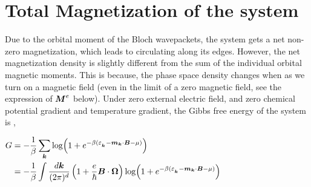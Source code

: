 \documentclass{report}
\renewcommand\vec[1]{\ensuremath\boldsymbol{#1}} %
\begin{document}
\section{Total Magnetization of the system}
Due to the orbital moment of the Bloch wavepackets, the system gets a net non-zero magnetization, which leads to circulating along its edges.
However, the net magnetization density is slightly different from the sum of the individual orbital magnetic moments. This is because, the phase space density changes when as we turn on a magnetic field (even in the limit of a zero magnetic field, see the expression of $\vec{M}^e$ below).
Under zero external electric field, and zero chemical potential gradient and temperature gradient, the Gibbs free energy of the system is \cite{PhysRevLett.97.026603}, 

$\begin{aligned}
G &= -\frac{1}{\beta} \sum_{\vec{k}} \log(1 + e^{-\beta(\varepsilon_{_{\vec{k}}} - \vec{m}_{\vec{k}}\cdot \vec{B} - \mu)}) \\
&= -\frac{1}{\beta} \int  \frac{d\vec{k}}{(2\pi)^d} \left(1+\frac{e}{\hbar} \vec{B}\cdot\vec{\Omega}\right) \log(1 + e^{-\beta(\varepsilon_{_{\vec{k}}} - \vec{m}_{\vec{k}}\cdot \vec{B} - \mu)})
\end{aligned}$
\end{document}
